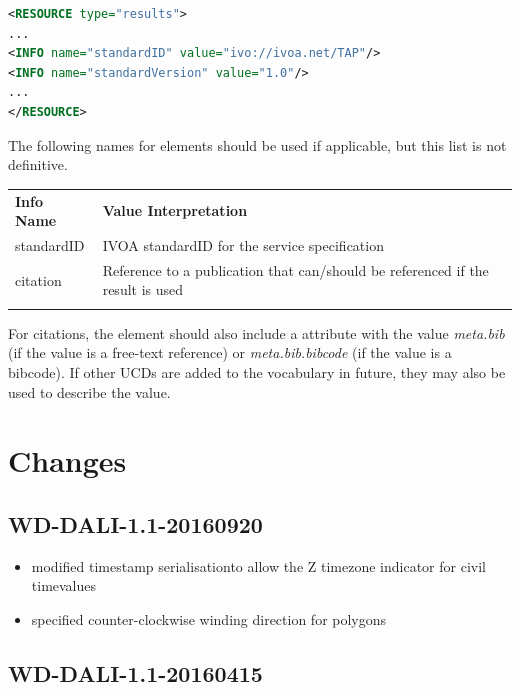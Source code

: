 \documentclass[11pt,letter]{ivoa}
\begin{document}
\begin{lstlisting}[language=XML]
<RESOURCE type="results">
...
<INFO name="standardID" value="ivo://ivoa.net/TAP"/>
<INFO name="standardVersion" value="1.0"/>
...
</RESOURCE>
\end{lstlisting}

The following names for  elements should be used if applicable, but this 
list is not definitive.

\begin{tabular}{l p{8cm}}
\sptablerule
\textbf{Info Name}&\textbf{Value Interpretation}\\
\sptablerule
standardID & IVOA standardID for the service specification \\
citation & Reference to a publication that can/should be referenced if the 
result is used \\
\sptablerule
\end{tabular}

For citations, the  element should also include a
 attribute with the 
value \emph{meta.bib} (if the value is a free-text reference) or
\emph{meta.bib.bibcode} (if 
the value is a bibcode). If other  UCDs are added to the vocabulary in 
future, they may also be used to describe the value.

\appendix

\section{Changes}

\subsection{WD-DALI-1.1-20160920}

\begin{itemize}
\item modified timestamp serialisationto allow the Z timezone indicator for 
civil timevalues
\item specified counter-clockwise winding direction for polygons
\end{itemize}

\subsection{WD-DALI-1.1-20160415}
\end{document}
